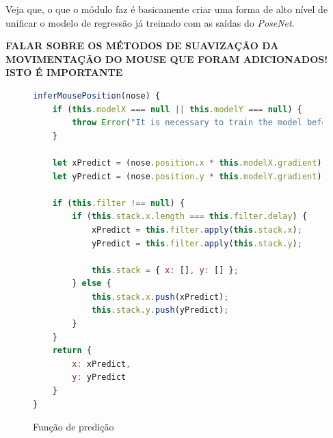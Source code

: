 \par Veja que, o que o módulo  faz é basicamente criar uma forma de alto nível de unificar o modelo de regressão já treinado com as saídas do \textit{PoseNet}.

\textbf{FALAR SOBRE OS MÉTODOS DE SUAVIZAÇÃO DA MOVIMENTAÇÃO DO MOUSE QUE FORAM ADICIONADOS! ISTO É IMPORTANTE}

\begin{figure}[H]
    \centering
    \begin{lstlisting}[language=JavaScript]
inferMousePosition(nose) {
    if (this.modelX === null || this.modelY === null) {
        throw Error("It is necessary to train the model before using this method");
    }

    let xPredict = (nose.position.x * this.modelX.gradient) + this.modelX.intercept;
    let yPredict = (nose.position.y * this.modelY.gradient) + this.modelY.intercept;

    if (this.filter !== null) {
        if (this.stack.x.length === this.filter.delay) {
            xPredict = this.filter.apply(this.stack.x);
            yPredict = this.filter.apply(this.stack.y);

            this.stack = { x: [], y: [] };
        } else {
            this.stack.x.push(xPredict);
            this.stack.y.push(yPredict);
        }
    }
    return {
        x: xPredict,
        y: yPredict
    }
}
    \end{lstlisting}
    \caption{Função de predição}
    \label{figure:funcao_predicao}
\end{figure}
